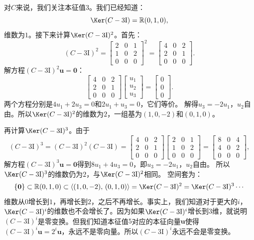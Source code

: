 \documentclass[12pt,UTF8,fontset=none]{ctexbook}
\begin{document}
对$C$来说，我们关注本征值$3$。我们已经知道：
$$
\Ker(C - 3\mathrm{I}) = \mathbb{R}(0,1,0),
$$
维数为$1$。接下来计算$\Ker(C - 3\mathrm{I})^2$。首先：
$$
(C - 3\mathrm{I})^2 = \begin{bmatrix} 2 & 0 & 1 \\ 1 & 0 & 2 \\ 0 & 0 & 0 \end{bmatrix}^2 = \begin{bmatrix} 4 & 0 & 2 \\ 2 & 0 & 1 \\ 0 & 0 & 0 \end{bmatrix}.
$$
解方程$(C - 3\mathrm{I})^2\mathbf{u} = \mathbf{0}$：
$$
\begin{bmatrix} 4 & 0 & 2 \\ 2 & 0 & 1 \\ 0 & 0 & 0 \end{bmatrix}\begin{bmatrix} u_1 \\ u_2 \\ u_3 \end{bmatrix} = \begin{bmatrix} 0 \\ 0 \\ 0 \end{bmatrix}.
$$
两个方程分别是$4u_1 + 2u_3 = 0$和$2u_1 + u_3 = 0$，它们等价。
解得$u_3 = -2u_1$，$u_2$自由。所以$\Ker(C - 3\mathrm{I})^2$的维数为$2$，一组基为$(1,0,-2)$和$(0,1,0)$。

再计算$\Ker(C - 3\mathrm{I})^3$。由于
$$
(C - 3\mathrm{I})^3 = (C - 3\mathrm{I})^2(C - 3\mathrm{I}) = \begin{bmatrix} 4 & 0 & 2 \\ 2 & 0 & 1 \\ 0 & 0 & 0 \end{bmatrix}\begin{bmatrix} 2 & 0 & 1 \\ 1 & 0 & 2 \\ 0 & 0 & 0 \end{bmatrix} = \begin{bmatrix} 8 & 0 & 4 \\ 4 & 0 & 2 \\ 0 & 0 & 0 \end{bmatrix},
$$
解方程$(C - 3\mathrm{I})^3\mathbf{u} = \mathbf{0}$得到$8u_1 + 4u_3 = 0$，即$u_3 = -2u_1$，$u_2$自由。
所以$\Ker(C - 3\mathrm{I})^3$的维数仍为$2$，与$\Ker(C - 3\mathrm{I})^2$相同。
空间套为：
$$
\{\mathbf{0}\} \subset \mathbb{R}(0,1,0) \subset \langle (1,0,-2),\, (0,1,0) \rangle = \Ker(C - 3\mathrm{I})^2 = \Ker(C - 3\mathrm{I})^3 \cdots
$$
维数从$0$增长到$1$，再增长到$2$，之后不再增长。事实上，我们知道对于更大的$i$，$\Ker(C - 3\mathrm{I})^i$的维数也不会增长了。因为如果$\Ker(C - 3\mathrm{I})^i$增长到$3$维，就说明$(C - 3\mathrm{I})^i$是零变换。但我们知道本征值$5$对应的本征向量$\mathbf{u}$使得$(C - 3\mathrm{I})^i\mathbf{u} = 2^i\mathbf{u}$，永远不是零向量。所以$(C - 3\mathrm{I})^i$永远不会是零变换。
\end{document}

